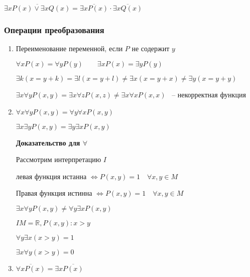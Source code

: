\documentclass[russian]{lecture-notes}
\begin{document}
    \begin{example}
        $\overline{\exists x P(x) \lor \exists x Q(x)} = \overline{\exists x P(x)} \cdot \overline{\exists x Q(x)}$
    \end{example}

    \subsubsection{Операции преобразования}

    \begin{enumerate}

        \item{
            Переименование переменной, если $P$ не содержит $y$

            $\forall x P(x) = \forall y P(y) \qquad \exists x P(x) = \exists y P(y)$

            $\exists k (x = y + k) = \exists l (x = y + l) \neq \exists x (x = y + x) \neq \exists y (x = y + y)$

            $\exists x \forall y P(x, y) = \exists x \forall z P (x, z) \neq \exists x \forall x P(x, x)$ ~-- некорректная функция
        }

        \item{
            $\forall x \forall y P(x, y) = \forall y \forall x P(x, y)$

            $\exists x \exists y P(x, y) = \exists y \exists x P(x, y)$


            \textbf{Доказательство для $\forall$}

            Рассмотрим интерпретацию $I$

            левая функция истанна $\Leftrightarrow P(x, y) = 1 \quad \forall x, y \in M$

            Правая функция истинна $\Leftrightarrow P(x, y) = 1 \quad \forall x, y \in M$

            \begin{remark}
                $\exists x \forall y P(x, y) \neq \forall y \exists x P(x, y)$

                $I M = \mathbb{R}, P(x, y): x > y$

                $\forall y \exists x (x > y) = 1$

                $\exists x \forall y (x > y) = 0$
            \end{remark}
        }

        \item{
            $\overline{\forall x P(x)} = \exists x \overline{P(x)}$

}
\end{enumerate}
\end{document}
